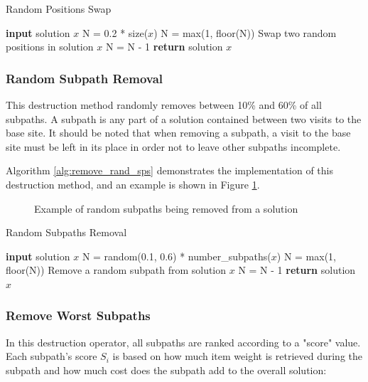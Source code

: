 \documentclass[conference]{IEEEtran}
\begin{document}
\begin{algorithm}[h]
\caption{Random Positions Swap}
\label{alg:swap_rand_pos}
\begin{algorithmic}[1]
\State \textbf{input} solution $x$
\State N = 0.2 * size($x$)
\State N = max(1, floor(N))
\State Swap two random positions in solution $x$
\State N = N - 1
\EndWhile
\State \textbf{return} solution $x$
\end{algorithmic}
\end{algorithm}


\subsubsection{Random Subpath Removal}

This destruction method randomly removes between 10\% and 60\% of all subpaths. A subpath is any part of a solution contained between two visits to the base site. It should be noted that when removing a subpath, a visit to the base site must be left in its place in order not to leave other subpaths incomplete.

Algorithm \ref{alg:remove_rand_sps} demonstrates the implementation of this destruction method, and an example is shown in Figure \ref{fig:remove_rand_sps}.

\begin{figure}[ht]
  	  \centering
  	  
      \caption{Example of random subpaths being removed from a solution}
      \label{fig:remove_rand_sps}
\end{figure}

\begin{algorithm}[h]
\caption{Random Subpaths Removal}
\label{alg:remove_rand_sps}
\begin{algorithmic}[1]
\State \textbf{input} solution $x$
\State N = random(0.1, 0.6) * number\_subpaths($x$)
\State N = max(1, floor(N))
\State Remove a random subpath from solution $x$
\State N = N - 1
\EndWhile
\State \textbf{return} solution $x$
\end{algorithmic}
\end{algorithm}

\subsubsection{Remove Worst Subpaths}

In this destruction operator, all subpaths are ranked according to a "score" value. Each subpath's score $S_i$ is based on how much item weight is retrieved during the subpath and how much cost does the subpath add to the overall solution:
\end{document}
